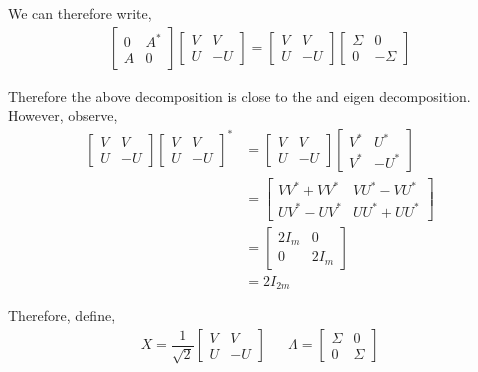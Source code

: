 \documentclass[10pt]{article}
\begin{document}
\begin{solution}[Solution]
We can therefore write,
\begin{align*}
    \left[\begin{array}{cc}0 & A^*\\A & 0\end{array}\right] \left[\begin{array}{cc}V & V\\U & -U\end{array}\right] = 
        \left[\begin{array}{cc}V & V\\U & -U\end{array}\right] \left[\begin{array}{cc}\Sigma & 0\\0 & -\Sigma\end{array}\right]
\end{align*}


Therefore the above decomposition is close to the and eigen decomposition. However, observe,
\begin{align*}
    \left[\begin{array}{cc}V & V \\ U & -U\end{array}\right] \left[\begin{array}{cc}V & V \\ U & -U\end{array}\right]^* 
    &=  \left[\begin{array}{cc}V & V \\ U & -U\end{array}\right] \left[\begin{array}{cc}V^* & U^* \\ V^* & -U^*\end{array}\right] \\
    &= \left[\begin{array}{cc}VV^*+VV^* & VU^*-VU^*\\UV^*-UV^* & UU^*+UU^*\end{array}\right] \\
    &= \left[\begin{array}{cc}2I_m & 0 \\ 0 & 2I_m\end{array}\right] \\
    &= 2I_{2m}
\end{align*}

Therefore, define,
\begin{align*}
    X= \dfrac{1}{\sqrt{2}} \left[\begin{array}{cc} V & V \\ U & -U\end{array}\right] && \Lambda = \left[\begin{array}{cc}\Sigma & 0\\0 & \Sigma\end{array}\right]
\end{align*}


\end{solution}
\end{document}
